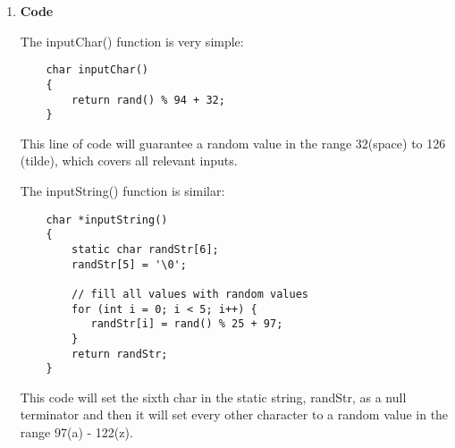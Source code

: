 \documentclass[11pt,letterpaper]{article}
\begin{document}
\begin{enumerate}
  \item \textbf{Code} 
    
      The inputChar() function is very simple:
    \begin{lstlisting}
    char inputChar()
    {
        return rand() % 94 + 32;
    }
    \end{lstlisting}

        This line of code will guarantee a random value in the range 32(space) to 126 (tilde), which
        covers all relevant inputs.

        The inputString() function is similar:

    \begin{lstlisting}
    char *inputString()
    {
        static char randStr[6];
        randStr[5] = '\0';
        
        // fill all values with random values
        for (int i = 0; i < 5; i++) {
           randStr[i] = rand() % 25 + 97;
        }
        return randStr;
    }
    \end{lstlisting}

    This code will set the sixth char in the static string, randStr, as a null terminator and
    then it will set every other character to a random value in the range 97(a) - 122(z). 


\end{enumerate}
\end{document}
